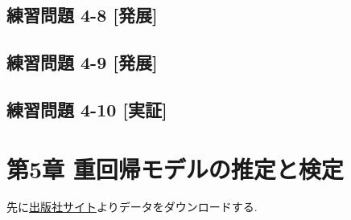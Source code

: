 \documentclass[
]{book}
\begin{document}
\hypertarget{ux7df4ux7fd2ux554fux984c-4-8-ux767aux5c55}{%
\section*{練習問題 4-8 {[}発展{]}}\label{ux7df4ux7fd2ux554fux984c-4-8-ux767aux5c55}}

\hypertarget{ux7df4ux7fd2ux554fux984c-4-9-ux767aux5c55}{%
\section*{練習問題 4-9 {[}発展{]}}\label{ux7df4ux7fd2ux554fux984c-4-9-ux767aux5c55}}

\hypertarget{ux7df4ux7fd2ux554fux984c-4-10-ux5b9fux8a3c}{%
\section*{練習問題 4-10 {[}実証{]}}\label{ux7df4ux7fd2ux554fux984c-4-10-ux5b9fux8a3c}}

\hypertarget{ch5}{%
\chapter*{第5章 重回帰モデルの推定と検定}\label{ch5}}

先に\href{https://www.yuhikaku.co.jp/books/detail/9784641053854}{出版社サイト}よりデータをダウンロードする.
\end{document}
